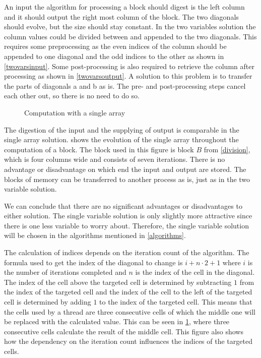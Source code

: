 An input the algorithm for processing a block should digest is the left column and it should output the right most column of the block.
The two diagonals should evolve, but the size should stay constant.
In the two variables solution the column values could be divided between and appended to the two diagonals.
This requires some preprocessing as the even indices of the column should be appended to one diagonal and the odd indices to the other as shown in \cref{twovarsinput}.
Some post-processing is also required to retrieve the column after processing as shown in \cref{twovarsoutput}.
A solution to this problem is to transfer the parts of diagonals a and b as is.
The pre- and post-processing steps cancel each other out, so there is no need to do so.

\begin{figure}[ht]
    \centering
    
    \caption{Computation with a single array} \label{singlevar}
\end{figure}

The digestion of the input and the supplying of output is comparable in the single array solution.
 shows the evolution of the single array throughout the computation of a block.
The block used in this figure is block $B$ from \cref{division}, which is four columns wide and consists of seven iterations.
There is no advantage or disadvantage on which end the input and output are stored.
The blocks of memory can be transferred to another process as is, just as in the two variable solution.

We can conclude that there are no significant advantages or disadvantages to either solution.
The single variable solution is only slightly more attractive since there is one less variable to worry about.
Therefore, the single variable solution will be chosen in the algorithms mentioned in \cref{algorithms}.

The calculation of indices depends on the iteration count of the algorithm.
The formula used to get the index of the diagonal to change is $i + n \cdot 2 + 1$ where $i$ is the number of iterations completed and $n$ is the index of the cell in the diagonal.
The index of the cell above the targeted cell is determined by subtracting $1$ from the index of the targeted cell and the index of the cell to the left of the targeted cell is determined by adding $1$ to the index of the targeted cell.
This means that the cells used by a thread are three consecutive cells of which the middle one will be replaced with the calculated value.
This can be seen in \cref{singlevar}, where three consecutive cells calculate the result of the middle cell.
This figure also shows how the dependency on the iteration count influences the indices of the targeted cells.

